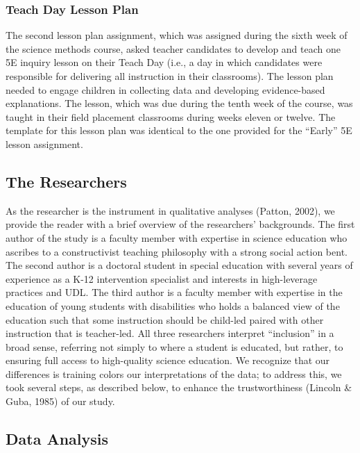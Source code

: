 \documentclass[11.5pt]{sig-alternate} %
\begin{document}
\begin{large}
\subsubsection*{Teach Day Lesson Plan}
The second lesson plan assignment, which was assigned during the sixth week of the science methods course, asked teacher candidates to develop and teach one 5E inquiry lesson on their Teach Day (i.e., a day in which candidates were responsible for delivering all instruction in their classrooms). The lesson plan needed to engage children in collecting data and developing evidence-based explanations. The lesson, which was due during the tenth week of the course, was taught in their field placement classrooms during weeks eleven or twelve.  The template for this lesson plan was identical to the one provided for the “Early” 5E lesson assignment. 

\subsection*{The Researchers}

As the researcher is the instrument in qualitative analyses (Patton, 2002), we provide the reader with a brief overview of the researchers’ backgrounds. The first author of the study is a faculty member with expertise in science education who ascribes to a constructivist teaching philosophy with a strong social action bent.  The second author is a doctoral student in special education with several years of experience as a K-12 intervention specialist and interests in high-leverage practices and UDL. The third author is a faculty member with expertise in the education of young students with disabilities who holds a balanced view of the education such that some instruction should be child-led paired with other instruction that is teacher-led. All three researchers interpret “inclusion” in a broad sense, referring not simply to where a student is educated, but rather, to ensuring full access to high-quality science education.  We recognize that our differences is training colors our interpretations of the data; to address this, we took several steps, as described below, to enhance the trustworthiness (Lincoln \& Guba, 1985) of our study. 

\subsection*{Data Analysis}


\end{large}
\end{document}
